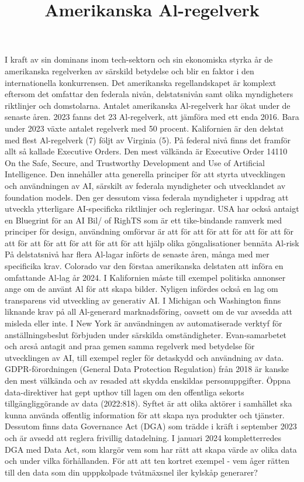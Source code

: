 {{{{{{{{{{{{{{{\title{
Amerikanska Al-regelverk
}
I kraft av sin dominans inom tech-sektorn och sin ekonomiska styrka år de amerikanska regelverken av särskild betydelse och blir en faktor i den internationella konkurrensen. Det amerikanska regellandskapet är komplext eftersom det omfattar den federala nivån, delstatsnivån samt olika myndigheters riktlinjer och domstolarna.
Antalet amerikanska Al-regelverk har ökat under de senaste åren. 2023 fanns det 23 Al-regelverk, att jämföra med ett enda 2016. Bara under 2023 växte antalet regelverk med 50 procent. Kalifornien är den delstat med flest Al-regelverk (7) följt av Virginia (5).
På federal nivå finns det framför allt så kallade Executive Orders. Den mest välkända är Executive Order 14110 On the Safe, Secure, and Trustworthy Development and Use of Artificial Intelligence. Den innehåller atta generella principer för att styrta utvecklingen och användningen av AI, särskilt av federala myndigheter och utvecklandet av foundation models. Den ger dessutom vissa federala myndigheter i uppdrag att utveckla ytterligare AI-specificka riktlinjer och regleringar. USA har också antaigt en Bluegrint för an AI Bil/ of RighTS som är ett tike-bindande ramverk med principer för design, användning omförvar är att för att för att för att för att för att för att för att för att för att för att hjälp olika
göngalisationer bennäta Al-risk
På delstatsnivå har flera Al-lagar införts de senaste åren, många med mer specificika krav. Colorado var den förstaa amerikanska delstaten att införa en omfattande Al-lag år 2024. I Kalifornien måste till exempel politiska annonser ange om de använt Al för att skapa bilder. Nyligen infördes också en lag om transparens vid utveckling av generativ AI. I Michigan och Washington finns liknande krav på all Al-generard marknadsföring, oavsett om de var avsedda att misleda eller inte. I New York är användningen av automatiserade verktyf för anställningsbeslut förbjuden under särskilda omständigheter.
Evan-samarbetet och arcså antagit and praa gemen samma regelverk med betydelse för utvecklingen av AI, till exempel regler för detaskydd och användning av data. GDPR-förordningen (General Data Protection Regulation) från 2018 är kanske den mest välkända och av resaded att skydda enskildas personuppgifter. Öppna data-direktiver hat gept upthov till lagen om den offentliga sekorts tillgängliggörande av data (2022:818). Syftet är att olika aktörer i samhället ska kunna använda offentlig information för att skapa nya produkter och tjänster. Dessutom finns data Governance Act (DGA) som trädde i kräft i september 2023 och är avsedd att reglera frivillig datadelning. I januari 2024 kompletterredes DGA med Data Act, som klargör vem som har rätt att skapa värde av olika data och under vilka förhållanden. För att att ten kortret exempel - vem åger rätten till den data som din upppkolpade tvåtmäxsnel iler kylskåp generarer?
}}}}}}}}}}}}}}}
